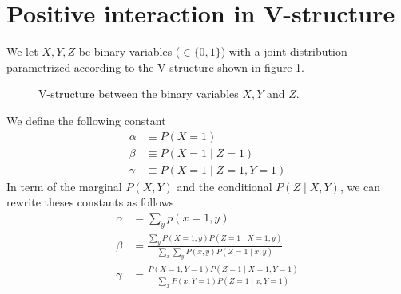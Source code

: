 \documentclass{article}
\numberwithin{equation}{section}
\theoremstyle{named}
\begin{document}
\section{Positive interaction in V-structure}
We let $X,Y,Z$ be binary variables ($\in \{0, 1\} $) with a joint distribution 
parametrized according to the V-structure shown in figure \ref{fig:Vstrct}.
\begin{figure}[H]
        \centering
        
        \caption{V-structure between the binary variables $X, Y$ and $Z$.}
        \label{fig:Vstrct}
\end{figure}

We define the following constant
\begin{align*}
        \alpha &\equiv P(X = 1) \\ 
        \beta &\equiv P(X = 1 \mid Z = 1) \\
        \gamma &\equiv P(X = 1 \mid Z = 1 , Y = 1)
\end{align*}
In term of the marginal $P(X, Y)$ and the conditional $P(Z \mid X, Y)$,
we can rewrite theses constants as follows
\begin{align*}
        \alpha &= \sum_y p(x = 1, y) \\[2ex]
        \beta &= \frac{\displaystyle \sum_y P(X = 1, y) P(Z=1 \mid X=1, y)}{ 
        \displaystyle \sum_x \sum_y P(x, y) P(Z = 1 \mid x, y)} \\[2ex]
                \gamma &=\frac{P(X = 1, Y = 1) P(Z = 1 \mid X = 1, Y = 1)}{
                        \displaystyle
                \sum_x P(x, Y = 1) P(Z = 1 \mid x, Y = 1)} 
\end{align*}
\end{document}
